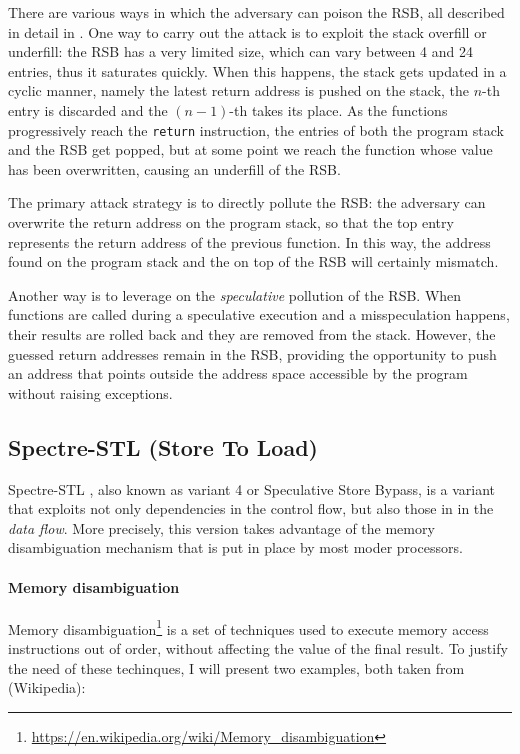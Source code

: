 \documentclass[12pt,a4paper]{book}
\theoremstyle{definition}
\begin{document}
	There are various ways in which the adversary can poison the RSB, all described in detail in \cite{Koruyeh2018}. One way to carry out the attack is to exploit the stack overfill or underfill: the RSB has a very limited size, which can vary between 4 and 24 entries, thus it saturates quickly. When this happens, the stack gets updated in a cyclic manner, namely the latest return address is pushed on the stack, the $n$-th entry is discarded and the $(n-1)$-th takes its place. As the functions progressively reach the \texttt{return} instruction, the entries of both the program stack and the RSB get popped, but at some point we reach the function whose value has been overwritten, causing an underfill of the RSB.
	
	The primary attack strategy is to directly pollute the RSB: the adversary can overwrite the return address on the program stack, so that the top entry represents the return address of the previous function. In this way, the address found on the program stack and the on top of the RSB will certainly mismatch. 
	
	Another way is to leverage on the \textit{speculative} pollution of the RSB. When functions are called during a speculative execution and a misspeculation happens, their results are rolled back and they are removed from the stack. However, the guessed return addresses remain in the RSB, providing the opportunity to push an address that points outside the address space accessible by the program without raising exceptions.
	
	\subsection{Spectre-STL (Store To Load)}\label{sec:spectre-stl}
	Spectre-STL \cite{Canella2019}, also known as variant 4 or Speculative Store Bypass, is a variant that exploits not only dependencies in the control flow, but also those in in the \textit{data flow}. More precisely, this version takes advantage of the memory disambiguation mechanism that is put in place by most moder processors.
	
	\paragraph{Memory disambiguation} Memory disambiguation\footnote{\url{https://en.wikipedia.org/wiki/Memory_disambiguation}} is a set of techniques used to execute memory access instructions out of order, without affecting the value of the final result. To justify the need of these techinques, I will present two examples, both taken from (Wikipedia):
	
\end{document}
